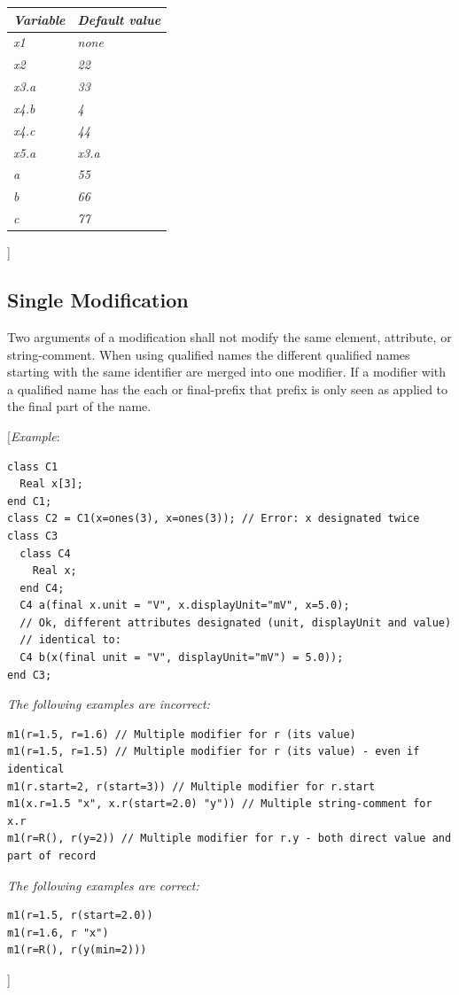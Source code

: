 \documentclass[10pt,a4paper]{report}
\def\doublelabel#1{\label{#1}}
\begin{document}
\begin{longtable}[]{|@{}l|l@{}|} 
\hline \endhead
\emph{Variable} & \emph{Default value}\\ \hline
\emph{x1} & \emph{none}\\ \hline
\emph{x2} & \emph{22}\\ \hline
\emph{x3.a} & \emph{33}\\ \hline
\emph{x4.b} & \emph{4}\\ \hline
\emph{x4.c} & \emph{44}\\ \hline
\emph{x5.a} & \emph{x3.a}\\ \hline
\emph{a} & \emph{55}\\ \hline
\emph{b} & \emph{66}\\ \hline
\emph{c} & \emph{77}\\ \hline

\end{longtable}

{]}

\subsection{Single Modification}\doublelabel{single-modification}

Two arguments of a modification shall not modify the same element,
attribute, or string-comment. When using qualified names the different
qualified names starting with the same identifier are merged into one
modifier. If a modifier with a qualified name has the each or
final-prefix that prefix is only seen as applied to the final part of
the name.

{[}\emph{Example}:
\begin{lstlisting}[language=modelica]
class C1
  Real x[3];
end C1;
class C2 = C1(x=ones(3), x=ones(3)); // Error: x designated twice
class C3
  class C4
    Real x;
  end C4;
  C4 a(final x.unit = "V", x.displayUnit="mV", x=5.0);
  // Ok, different attributes designated (unit, displayUnit and value)
  // identical to:
  C4 b(x(final unit = "V", displayUnit="mV") = 5.0));
end C3;
\end{lstlisting}

\emph{The following examples are incorrect:}
\begin{lstlisting}[language=modelica]
m1(r=1.5, r=1.6) // Multiple modifier for r (its value)
m1(r=1.5, r=1.5) // Multiple modifier for r (its value) - even if identical
m1(r.start=2, r(start=3)) // Multiple modifier for r.start
m1(x.r=1.5 "x", x.r(start=2.0) "y")) // Multiple string-comment for x.r
m1(r=R(), r(y=2)) // Multiple modifier for r.y - both direct value and part of record
\end{lstlisting}
\emph{The following examples are correct:}
\begin{lstlisting}[language=modelica]
m1(r=1.5, r(start=2.0))
m1(r=1.6, r "x")
m1(r=R(), r(y(min=2)))
\end{lstlisting}
{]}
\end{document}
